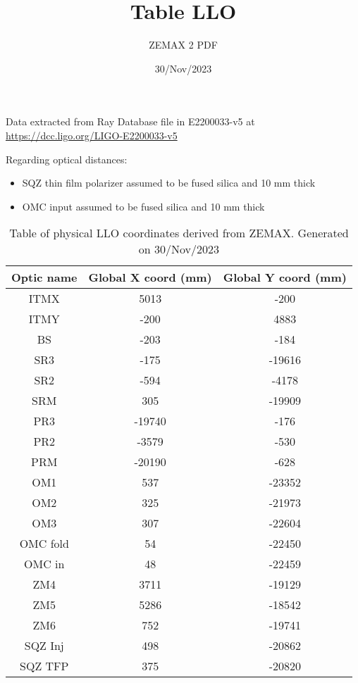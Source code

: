 \documentclass{article}
\title{Table LLO}
\author{ZEMAX 2 PDF }
\date{30/Nov/2023}
\begin{document}
\maketitle


Data extracted from Ray Database file in E2200033-v5 at \url{https://dcc.ligo.org/LIGO-E2200033-v5}


 Regarding optical distances:
\begin{itemize} 
 \item SQZ thin film polarizer assumed to be fused silica and 10 mm thick
 \item OMC input assumed to be fused silica and 10 mm thick
\end{itemize}

\begin{table}[h!] 
\centering 
\begin{tabular}{| c| c | c |} 
\hline \bf{Optic name} & \bf{Global X coord (mm)} & \bf{Global Y coord (mm)} \\ \hline 
ITMX & 5013 & -200 \\ 
ITMY & -200 & 4883 \\ 
BS & -203 & -184 \\ 
SR3 & -175 & -19616 \\ 
SR2 & -594 & -4178 \\ 
SRM & 305 & -19909 \\ 
PR3 & -19740 & -176 \\ 
PR2 & -3579 & -530 \\ 
PRM & -20190 & -628 \\ 
OM1 & 537 & -23352 \\ 
OM2 & 325 & -21973 \\ 
OM3 & 307 & -22604 \\ 
OMC fold & 54 & -22450 \\ 
OMC in & 48 & -22459 \\ 
ZM4 & 3711 & -19129 \\ 
ZM5 & 5286 & -18542 \\ 
ZM6 & 752 & -19741 \\ 
SQZ Inj & 498 & -20862 \\ 
SQZ TFP & 375 & -20820 \\ 
\hline 
\end{tabular} 
\caption{Table of physical LLO coordinates derived from ZEMAX. Generated on 30/Nov/2023}
\end{table} 
\end{document}
